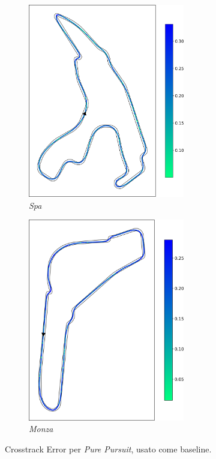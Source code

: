 \begin{figure}[H]
    \centering
    \begin{subfigure}[b]{0.49\textwidth}
        \centering
        \includegraphics[width=0.75\textwidth]{images/spa_pp_crosstrack.png} 
        \caption{\textit{Spa}}
        \label{fig:tracking_pp_spa}
    \end{subfigure}
    \begin{subfigure}[b]{0.469\textwidth}
        \centering
        \includegraphics[width=0.75\textwidth]{images/monza_pp_crosstrack.png}
        \caption{\textit{Monza}}
        \label{fig:tracking_pp_monza}
    \end{subfigure}
    \caption{Crosstrack Error per \textit{Pure Pursuit}, usato come baseline.}
    \label{fig:fig17} %
\end{figure}
